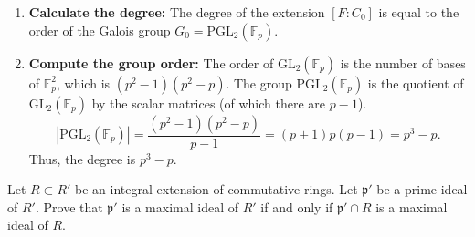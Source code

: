 \begin{solution}
\begin{enumerate}
    \item \textbf{Calculate the degree:} The degree of the extension $[F : C_0]$ is equal to the order of the Galois group $G_0 = \mathrm{PGL}_2(\mathbb{F}_p)$.

    \item \textbf{Compute the group order:} The order of $\mathrm{GL}_2(\mathbb{F}_p)$ is the number of bases of $\mathbb{F}_p^2$, which is $(p^2-1)(p^2-p)$. The group $\mathrm{PGL}_2(\mathbb{F}_p)$ is the quotient of $\mathrm{GL}_2(\mathbb{F}_p)$ by the scalar matrices (of which there are $p-1$).
    \[ |\mathrm{PGL}_2(\mathbb{F}_p)| = \frac{(p^2-1)(p^2-p)}{p-1} = (p+1)p(p-1) = p^3 - p. \]
    Thus, the degree is $p^3 - p$.
\end{enumerate}
\end{solution}

\begin{exercise}
\label{algebra:2019:3}
Let $R \subset R'$ be an integral extension of commutative rings. Let $\mathfrak{p}'$ be a prime ideal of $R'$. Prove that $\mathfrak{p}'$ is a maximal ideal of $R'$ if and only if $\mathfrak{p}' \cap R$ is a maximal ideal of $R$.
\end{exercise}

